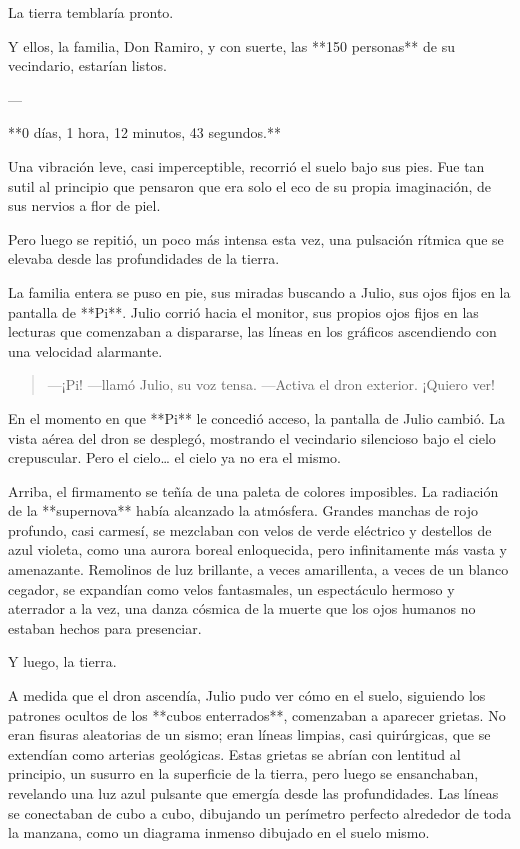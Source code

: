 \documentclass[a4paper,12pt]{book}
\begin{document}
La tierra temblaría pronto.

Y ellos, la familia, Don Ramiro, y con suerte, las **150 personas** de su vecindario, estarían listos.

---

**0 días, 1 hora, 12 minutos, 43 segundos.**

Una vibración leve, casi imperceptible, recorrió el suelo bajo sus pies. Fue tan sutil al principio que pensaron que era solo el eco de su propia imaginación, de sus nervios a flor de piel.

Pero luego se repitió, un poco más intensa esta vez, una pulsación rítmica que se elevaba desde las profundidades de la tierra.

La familia entera se puso en pie, sus miradas buscando a Julio, sus ojos fijos en la pantalla de **Pi**. Julio corrió hacia el monitor, sus propios ojos fijos en las lecturas que comenzaban a dispararse, las líneas en los gráficos ascendiendo con una velocidad alarmante.

\begin{quote}
    —¡Pi! —llamó Julio, su voz tensa. —Activa el dron exterior. ¡Quiero ver!
\end{quote}

En el momento en que **Pi** le concedió acceso, la pantalla de Julio cambió. La vista aérea del dron se desplegó, mostrando el vecindario silencioso bajo el cielo crepuscular. Pero el cielo… el cielo ya no era el mismo.

Arriba, el firmamento se teñía de una paleta de colores imposibles. La radiación de la **supernova** había alcanzado la atmósfera. Grandes manchas de rojo profundo, casi carmesí, se mezclaban con velos de verde eléctrico y destellos de azul violeta, como una aurora boreal enloquecida, pero infinitamente más vasta y amenazante. Remolinos de luz brillante, a veces amarillenta, a veces de un blanco cegador, se expandían como velos fantasmales, un espectáculo hermoso y aterrador a la vez, una danza cósmica de la muerte que los ojos humanos no estaban hechos para presenciar.

Y luego, la tierra.

A medida que el dron ascendía, Julio pudo ver cómo en el suelo, siguiendo los patrones ocultos de los **cubos enterrados**, comenzaban a aparecer grietas. No eran fisuras aleatorias de un sismo; eran líneas limpias, casi quirúrgicas, que se extendían como arterias geológicas. Estas grietas se abrían con lentitud al principio, un susurro en la superficie de la tierra, pero luego se ensanchaban, revelando una luz azul pulsante que emergía desde las profundidades. Las líneas se conectaban de cubo a cubo, dibujando un perímetro perfecto alrededor de toda la manzana, como un diagrama inmenso dibujado en el suelo mismo.
\end{document}
